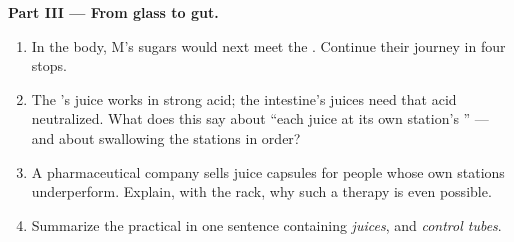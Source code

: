 \begin{problem}
\medskip\noindent\textbf{Part III --- From glass to gut.}
\begin{enumerate}[resume]
  \item In the body, M's sugars would next meet the
        . Continue their journey in four stops.
  \item The 's juice works in strong acid; the
        intestine's juices need that acid neutralized.
        What does this say about ``each juice at its own
        station's '' --- and about swallowing
        the stations in order?
  \item A pharmaceutical company sells juice capsules
        for people whose own stations underperform.
        Explain, with the rack, why such a therapy is
        even possible.
  \item Summarize the practical in one sentence
        containing \emph{juices}, \emph{} and
        \emph{control tubes}.
\end{enumerate}
\end{problem}
